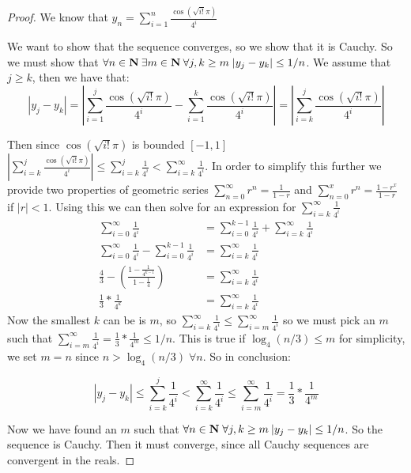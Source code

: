\documentclass[11pt]{article}
\begin{document}
\begin{proof}

We know that $y_n = \sum_{i = 1} ^n \frac{\cos(\sqrt{i!}\pi)}{4^i}$

We want to show that the sequence converges, so we show that it is Cauchy. So we must show that $\forall n \in \mathbf{N} \: \exists m \in \mathbf{N} \: \forall j,k \geq m \; |y_j - y_k| \leq 1/n$. 
We assume that $j \geq k$, then we have that:
$$|y_j - y_k| = \left| \sum_{i = 1} ^j \frac{\cos(\sqrt{i!}\pi)}{4^i} - \sum_{i = 1} ^k \frac{\cos(\sqrt{i!}\pi)}{4^i} \right| = \left| \sum_{i = k} ^j \frac{\cos(\sqrt{i!}\pi)}{4^i} \right|$$

Then since $\cos(\sqrt{i!}\pi)$ is bounded $[-1, 1]$ 
$\left| \sum_{i = k} ^j \frac{\cos(\sqrt{i!}\pi)}{4^i} \right| \leq \sum_{i = k} ^j \frac{1}{4^i} < \sum_{i = k} ^\infty \frac{1}{4^i}$.
 In order to simplify this further we provide two properties of geometric series $\sum_{n=0}^\infty r^n = \frac{1}{1-r}$ and $\sum_{n=0}^x r^n = \frac{1-r^x}{1-r}$ if $|r| < 1$. Using this we can then solve for an expression for $\sum_{i = k} ^\infty \frac{1}{4^i}$
\begin{align*}
\sum_{i=0}^\infty \frac{1}{4^i} &= \sum_{i=0}^{k-1} \frac{1}{4^i} + \sum_{i=k}^\infty \frac{1}{4^i}\\
\sum_{i=0}^\infty \frac{1}{4^i} - \sum_{i=0}^{k-1} \frac{1}{4^i} &= \sum_{i=k}^\infty \frac{1}{4^i}\\
\frac{4}{3} - \left(\frac{1 - \frac{1}{4^{k-1}}}{1-\frac{1}{4}} \right) &= \sum_{i=k}^\infty \frac{1}{4^i}\\
\frac{1}{3} * \frac{1}{4^k} &= \sum_{i=k}^\infty \frac{1}{4^i}
\end{align*}
Now the smallest $k$ can be is $m$, so $\sum_{i = k} ^\infty \frac{1}{4^i} \leq \sum_{i = m} ^\infty \frac{1}{4^i}$ so we must pick an $m$ such that $\sum_{i=m}^\infty \frac{1}{4^i} = \frac{1}{3} * \frac{1}{4^m} \leq 1/n$. This is true if $\log_4(n/3) \leq m$ for simplicity, we set $m = n$ since $n > \log_4(n/3) \; \forall n$. So in conclusion:

$$|y_j - y_k| \leq \sum_{i = k} ^j \frac{1}{4^i} < \sum_{i = k} ^\infty \frac{1}{4^i} \leq \sum_{i = m} ^\infty \frac{1}{4^i} = \frac{1}{3} * \frac{1}{4^m}$$

Now we have found an $m$ such that $\forall n \in \mathbf{N} \; \forall j,k \geq m \: |y_j - y_k| \leq 1/n$. So the sequence is Cauchy. Then it must converge, since all Cauchy sequences are convergent in the reals.

\end{proof}
\end{document}
